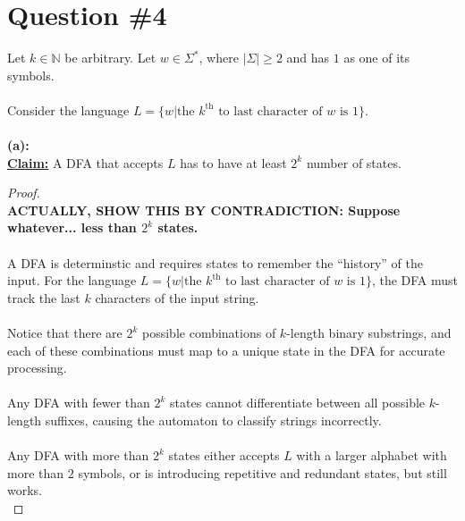 \documentclass[12pt]{article}
\begin{document}
\section*{Question \#4}
Let $k \in \mathbb{N}$ be arbitrary. Let $w \in \Sigma^*$, where $|\Sigma| \geq 2$ and has $1$ as one of its symbols. \\
\\
Consider the language $L = \{ w | \text{the $k^\text{th}$ to last character of $w$ is $1$} \}$. \\
\\
\textbf{(a):} \\
\textbf{\underline{Claim:}} A DFA that accepts $L$ has to have at least $2^k$ number of states.
\begin{proof}
\leavevmode\\
    \textbf{ACTUALLY, SHOW THIS BY CONTRADICTION: Suppose whatever... less than $2^k$ states.} \\
    \\
    A DFA is determinstic and requires states to remember the ``history'' of the input. For the language $L = \{ w | \text{the $k^\text{th}$ to last character of $w$ is $1$} \}$, the DFA must track the last $k$ characters of the input string. \\
    \\
    Notice that there are $2^k$ possible combinations of $k$-length binary substrings, and each of these combinations must map to a unique state in the DFA for accurate processing. \\
    \\
    Any DFA with fewer than $2^k$ states cannot differentiate between all possible $k$-length suffixes, causing the automaton to classify strings incorrectly. \\
    \\
    Any DFA with more than $2^k$ states either accepts $L$ with a larger alphabet with more than $2$ symbols, or is introducing repetitive and redundant states, but still works. \\
\end{proof}
\end{document}
